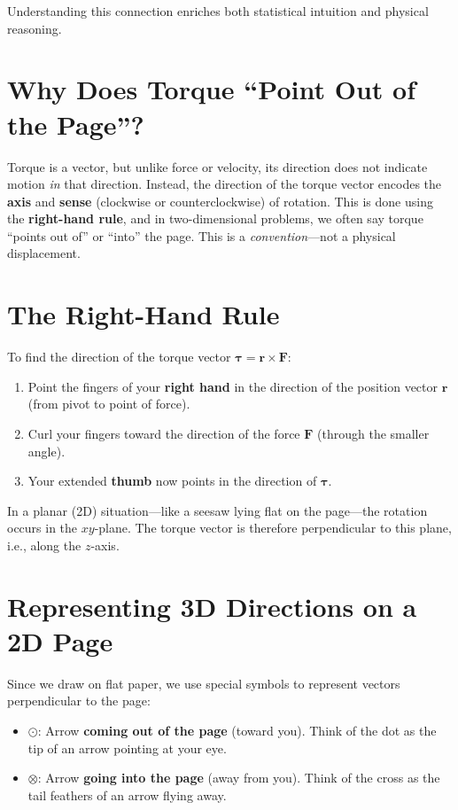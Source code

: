 \documentclass{article}
\begin{document}
Understanding this connection enriches both statistical intuition and physical reasoning.





\section{Why Does Torque ``Point Out of the Page''?}

Torque is a vector, but unlike force or velocity, its direction does not indicate motion \textit{in} that direction. Instead, the direction of the torque vector encodes the \textbf{axis} and \textbf{sense} (clockwise or counterclockwise) of rotation. This is done using the \textbf{right-hand rule}, and in two-dimensional problems, we often say torque ``points out of'' or ``into'' the page. This is a \textit{convention}—not a physical displacement.

\section{The Right-Hand Rule}

To find the direction of the torque vector $\boldsymbol{\tau} = \mathbf{r} \times \mathbf{F}$:

\begin{enumerate}[label=\arabic*.]
    \item Point the fingers of your \textbf{right hand} in the direction of the position vector $\mathbf{r}$ (from pivot to point of force).
    \item Curl your fingers toward the direction of the force $\mathbf{F}$ (through the smaller angle).
    \item Your extended \textbf{thumb} now points in the direction of $\boldsymbol{\tau}$.
\end{enumerate}

In a planar (2D) situation—like a seesaw lying flat on the page—the rotation occurs in the $xy$-plane. The torque vector is therefore perpendicular to this plane, i.e., along the $z$-axis.

\section{Representing 3D Directions on a 2D Page}

Since we draw on flat paper, we use special symbols to represent vectors perpendicular to the page:

\begin{itemize}
\item $\odot$: Arrow \textbf{coming out of the page} (toward you).  
    Think of the dot as the tip of an arrow pointing at your eye.
    
    \item $\otimes$: Arrow \textbf{going into the page} (away from you).  
    Think of the cross as the tail feathers of an arrow flying away.
\end{itemize}
\end{document}
